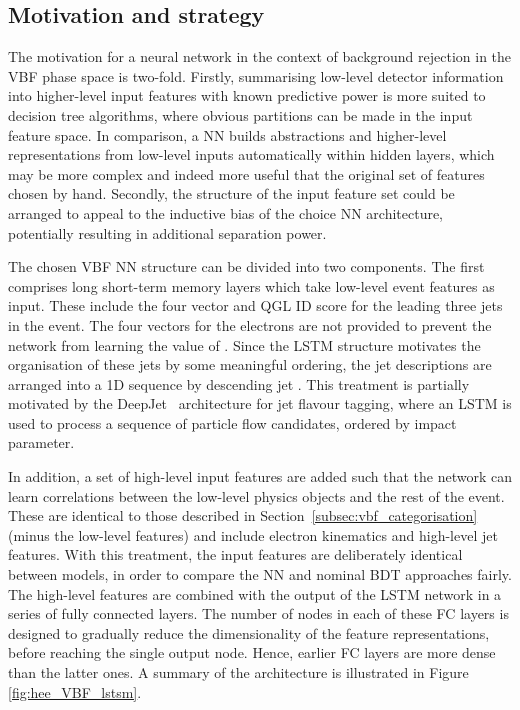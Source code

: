 \subsection{Motivation and strategy}

The motivation for a neural network in the context of background rejection in the VBF phase space is two-fold. Firstly, summarising low-level detector information into higher-level input features with known predictive power is more suited to decision tree algorithms, where obvious partitions can be made in the input feature space. In comparison, a NN builds abstractions and higher-level representations from low-level inputs automatically within hidden layers, which may be more complex and indeed more useful that the original set of features chosen by hand. %
Secondly, the structure of the input feature set could be arranged to appeal to the inductive bias of the choice NN architecture, potentially resulting in additional separation power. 

The chosen VBF NN structure can be divided into two components. The first comprises long short-term memory layers which take low-level event features as input. These include the four vector and QGL ID score for the leading three jets in the event. The four vectors for the electrons are not provided to prevent the network from learning the value of \mee. Since the LSTM structure motivates the organisation of these jets by some meaningful ordering, the jet descriptions are arranged into a 1D sequence by descending jet \pt. This treatment is partially motivated by the DeepJet~\cite{deepJet} architecture for jet flavour tagging, where an LSTM is used to process a sequence of particle flow candidates, ordered by impact parameter.

In addition, a set of high-level input features are added such that the network can learn correlations between the low-level physics objects and the rest of the event. 
These are identical to those described in Section~\ref{subsec:vbf_categorisation} (minus the low-level features) and include electron kinematics and high-level jet features.
With this treatment, the input features are deliberately identical between models, in order to compare the NN and nominal BDT approaches fairly. The high-level features are combined with the output of the LSTM network in a series of fully connected layers. The number of nodes in each of these FC layers is designed to gradually reduce the dimensionality of the feature representations, before reaching the single output node. Hence, earlier FC layers are more dense than the latter ones. A summary of the architecture is illustrated in Figure \ref{fig:hee_VBF_lstsm}. %

